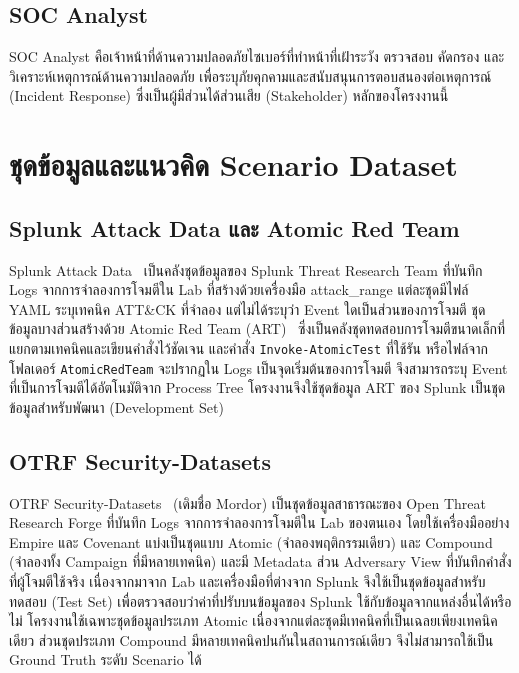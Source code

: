 \subsection{SOC Analyst}
SOC Analyst คือเจ้าหน้าที่ด้านความปลอดภัยไซเบอร์ที่ทำหน้าที่เฝ้าระวัง ตรวจสอบ คัดกรอง
และวิเคราะห์เหตุการณ์ด้านความปลอดภัย เพื่อระบุภัยคุกคามและสนับสนุนการตอบสนองต่อเหตุการณ์ (Incident Response)
ซึ่งเป็นผู้มีส่วนได้ส่วนเสีย (Stakeholder) หลักของโครงงานนี้

\section{ชุดข้อมูลและแนวคิด Scenario Dataset}

\subsection{Splunk Attack Data และ Atomic Red Team}
Splunk Attack Data~\cite{splunk-attack-data} เป็นคลังชุดข้อมูลของ Splunk Threat Research Team
ที่บันทึก Logs จากการจำลองการโจมตีใน Lab ที่สร้างด้วยเครื่องมือ attack\_range
แต่ละชุดมีไฟล์ YAML ระบุเทคนิค ATT\&CK ที่จำลอง แต่ไม่ได้ระบุว่า Event ใดเป็นส่วนของการโจมตี
ชุดข้อมูลบางส่วนสร้างด้วย Atomic Red Team (ART)~\cite{atomic-red-team}
ซึ่งเป็นคลังชุดทดสอบการโจมตีขนาดเล็กที่แยกตามเทคนิคและเขียนคำสั่งไว้ชัดเจน
และคำสั่ง \texttt{Invoke-AtomicTest} ที่ใช้รัน หรือไฟล์จากโฟลเดอร์ \texttt{AtomicRedTeam}
จะปรากฏใน Logs เป็นจุดเริ่มต้นของการโจมตี
จึงสามารถระบุ Event ที่เป็นการโจมตีได้อัตโนมัติจาก Process Tree
โครงงานจึงใช้ชุดข้อมูล ART ของ Splunk เป็นชุดข้อมูลสำหรับพัฒนา (Development Set)

\subsection{OTRF Security-Datasets}
OTRF Security-Datasets~\cite{otrf-security-datasets} (เดิมชื่อ Mordor) เป็นชุดข้อมูลสาธารณะของ Open Threat Research Forge
ที่บันทึก Logs จากการจำลองการโจมตีใน Lab ของตนเอง โดยใช้เครื่องมืออย่าง Empire และ Covenant
แบ่งเป็นชุดแบบ Atomic (จำลองพฤติกรรมเดียว) และ Compound (จำลองทั้ง Campaign ที่มีหลายเทคนิค)
และมี Metadata ส่วน Adversary View ที่บันทึกคำสั่งที่ผู้โจมตีใช้จริง
เนื่องจากมาจาก Lab และเครื่องมือที่ต่างจาก Splunk จึงใช้เป็นชุดข้อมูลสำหรับทดสอบ (Test Set)
เพื่อตรวจสอบว่าค่าที่ปรับบนข้อมูลของ Splunk ใช้กับข้อมูลจากแหล่งอื่นได้หรือไม่
โครงงานใช้เฉพาะชุดข้อมูลประเภท Atomic เนื่องจากแต่ละชุดมีเทคนิคที่เป็นเฉลยเพียงเทคนิคเดียว
ส่วนชุดประเภท Compound มีหลายเทคนิคปนกันในสถานการณ์เดียว จึงไม่สามารถใช้เป็น Ground Truth ระดับ Scenario ได้

